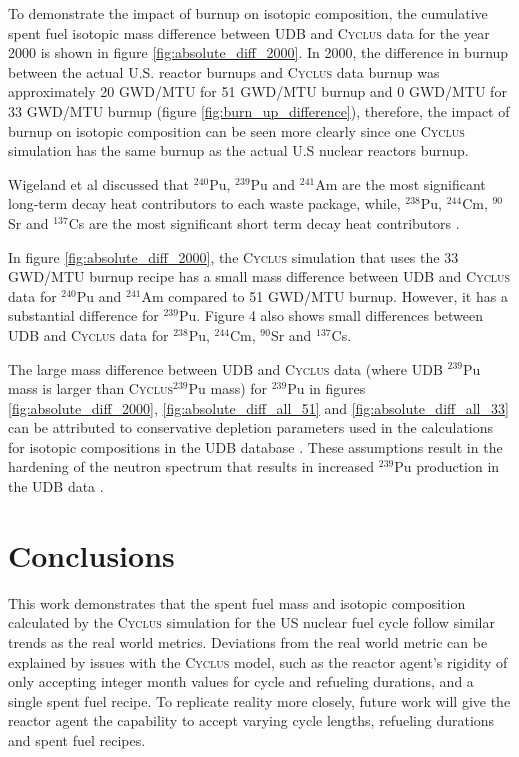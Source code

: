 \documentclass{anstrans}
\newcommand{\Cyclus}{\textsc{Cyclus}\xspace}%
\begin{document}
To demonstrate the impact of burnup on isotopic composition, the cumulative 
spent fuel isotopic mass difference between \gls{UDB} and \Cyclus data for 
the year 2000 is shown in figure \ref{fig:absolute_diff_2000}. In 2000, the difference in 
burnup between the actual U.S. reactor burnups and \Cyclus data burnup was 
approximately 20 GWD/MTU for 51 GWD/MTU burnup and 0 GWD/MTU for 33 GWD/MTU burnup 
(figure \ref{fig:burn_up_difference}), therefore, the impact of burnup on isotopic 
composition can be seen more clearly since one \Cyclus simulation has the same burnup as the 
actual U.S nuclear reactors burnup. 

Wigeland et al \cite{wigeland_separations_2006} discussed that $^{240}$Pu, 
$^{239}$Pu and $^{241}$Am are the most significant long-term decay heat 
contributors to each waste package, while, $^{238}$Pu, $^{244}$Cm, $^{90}$Sr 
and $^{137}$Cs are the most significant short term decay heat contributors 
\cite{wigeland_separations_2006}. 

In figure \ref{fig:absolute_diff_2000}, the \Cyclus simulation that uses the 33 
GWD/MTU burnup recipe has a small mass difference between \gls{UDB} and \Cyclus data 
for $^{240}$Pu and $^{241}$Am compared to 51 GWD/MTU burnup. However, it has a 
substantial difference for $^{239}$Pu. Figure 4 also shows small differences 
between \gls{UDB} and \Cyclus data for $^{238}$Pu, $^{244}$Cm, $^{90}$Sr and 
$^{137}$Cs. 

The large mass difference between \gls{UDB} and \Cyclus data (where \gls{UDB} $^{239}$Pu 
mass is larger than \Cyclus $^{239}$Pu mass) for $^{239}$Pu in figures 
\ref{fig:absolute_diff_2000}, \ref{fig:absolute_diff_all_51} and 
\ref{fig:absolute_diff_all_33} can be attributed to conservative depletion 
parameters used in the calculations for isotopic compositions in the \gls{UDB} 
database \cite{peterson_additional_2017}. These assumptions result in the 
hardening of the neutron spectrum that results in increased $^{239}$Pu 
production in the \gls{UDB} data \cite{peterson_additional_2017}. 

\section{Conclusions}
This work demonstrates that the spent fuel mass and isotopic composition 
calculated by the \Cyclus simulation for the \gls{US} nuclear fuel cycle 
follow similar trends as the real world metrics. Deviations from the real world metric 
can be explained by issues with the \Cyclus model, such as the reactor agent's rigidity 
of only accepting integer month values for cycle and refueling durations, and a single 
spent fuel recipe. To replicate reality more closely, future work 
will give the reactor agent the capability to accept varying cycle lengths, refueling 
durations and spent fuel recipes.
\end{document}
